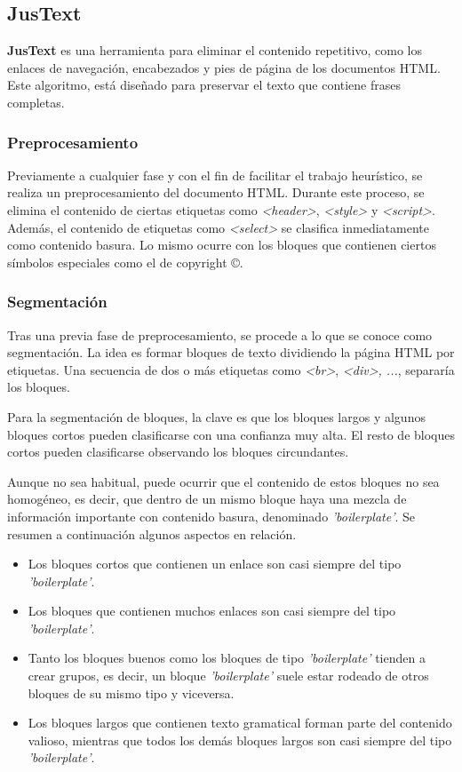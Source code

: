 \subsection{JusText}
\label{subsec:justext}

\textbf{JusText} \cite{justext} es una herramienta para eliminar el contenido repetitivo, como los enlaces
de navegación, encabezados y pies de página de los documentos HTML. Este algoritmo, está diseñado para
preservar el texto que contiene frases completas.

\subsubsection{Preprocesamiento}
\label{subsubsec:preprocesamiento}

Previamente a cualquier fase y con el fin de facilitar el trabajo heurístico, se realiza un preprocesamiento 
del documento HTML. Durante este proceso, se elimina el contenido de ciertas etiquetas como \emph{<header>}, 
\emph{<style>} y \emph{<script>}. Además, el contenido de etiquetas como \emph{<select>} se clasifica 
inmediatamente como contenido basura. Lo mismo ocurre con los bloques que contienen ciertos símbolos 
especiales como el de copyright ©.

\subsubsection{Segmentación}
\label{subsubsec:segmentacion}

Tras una previa fase de preprocesamiento, se procede a lo que se conoce como segmentación. La idea es formar 
bloques de texto dividiendo la página HTML por etiquetas. Una secuencia de dos o más etiquetas como 
\emph{<br>}, \emph{<div>, ...}, separaría los bloques. 

Para la segmentación de bloques, la clave es que los bloques largos y algunos bloques cortos pueden
clasificarse con una confianza muy alta. El resto de bloques cortos pueden clasificarse observando los
bloques circundantes. 

Aunque no sea habitual, puede ocurrir que el contenido de estos bloques no sea homogéneo, es decir, que
dentro de un mismo bloque haya una mezcla de información importante con contenido basura, denominado
\emph{'boilerplate'}. Se resumen a continuación algunos aspectos en relación.

\begin{itemize}
  \item Los bloques cortos que contienen un enlace son casi siempre del tipo \emph{'boilerplate'}.
  \item Los bloques que contienen muchos enlaces son casi siempre del tipo \emph{'boilerplate'}.
  \item Tanto los bloques buenos como los bloques de tipo \emph{'boilerplate'} tienden a crear grupos, es 
  decir, un bloque \emph{'boilerplate'} suele estar rodeado de otros bloques de su mismo tipo y viceversa.
  \item Los bloques largos que contienen texto gramatical forman parte del contenido valioso, mientras que 
  todos los demás bloques largos son casi siempre del tipo \emph{'boilerplate'}.
\end{itemize}

